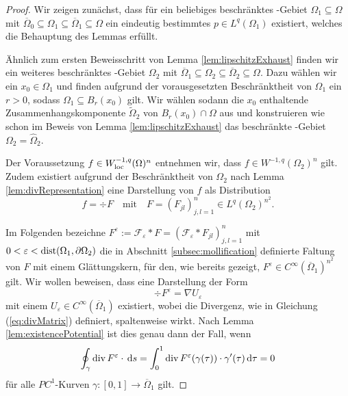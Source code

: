 \begin{proof}
  Wir zeigen zunächst, dass für ein beliebiges beschränktes \lipschitz\hyp{}Gebiet $\Omega_1 \subseteq \Omega$ mit $\overline\Omega_0 \subseteq \Omega_1 \subseteq \overline\Omega_1 \subseteq \Omega$ ein eindeutig bestimmtes $p \in L^q(\Omega_1)$ existiert, welches die Behauptung des Lemmas erfüllt.

  Ähnlich zum ersten Beweisschritt von Lemma \ref{lem:lipschitzExhaust} finden wir ein weiteres beschränktes \lipschitz\hyp{}Gebiet $\Omega_2$ mit $\overline\Omega_1 \subseteq \Omega_2 \subseteq \overline\Omega_2 \subseteq \Omega$.
  Dazu wählen wir ein $x_0 \in \Omega_1$ und finden aufgrund der vorausgesetzten Beschränktheit von $\Omega_1$ ein $r > 0$, sodass $\Omega_1 \subseteq B_r(x_0)$ gilt.
  Wir wählen sodann die $x_0$ enthaltende Zusammenhangskomponente $\widetilde\Omega_2$ von $B_r(x_0) \cap \Omega$ aus und konstruieren wie schon im Beweis von Lemma \ref{lem:lipschitzExhaust} das beschränkte \lipschitz\hyp{}Gebiet $\Omega_2 = \widehat\Omega_2$.

  Der Voraussetzung $f \in W_{\operatorname{loc}}^{-1,q}(\Omega)^n$ entnehmen wir, dass $f \in W^{-1,q}(\Omega_2)^n$ gilt. Zudem existiert aufgrund der Beschränktheit von $\Omega_2$ nach Lemma \ref{lem:divRepresentation} eine Darstellung von $f$ als Distribution
  $$
  f = \div F \quad\text{mit}\quad F = (F_{jl})_{j,l=1}^n \in L^q(\Omega_2)^{n^2}.
  $$

  Im Folgenden bezeichne $F^\varepsilon := \mathcal{F}_\varepsilon \ast F = (\mathcal{F}_\varepsilon \ast F_{jl})_{j,l=1}^n$ mit $0 < \varepsilon < \operatorname{dist}(\Omega_1, \partial\Omega_2)$ die in Abschnitt \ref{subsec:mollification} definierte Faltung von $F$ mit einem Glättungskern, für den, wie bereits gezeigt, $F^\varepsilon \in C^\infty(\overline\Omega_1)^{n^2}$ gilt.
  Wir wollen beweisen, dass eine Darstellung der Form
  \begin{equation}
    \label{eq:divNabla}
    \div F^\varepsilon = \nabla U_\varepsilon
  \end{equation}
  mit einem $U_\varepsilon \in C^\infty(\overline\Omega_1)$ existiert, wobei die Divergenz, wie in Gleichung (\ref{eq:divMatrix}) definiert, spaltenweise wirkt.
  Nach Lemma \ref{lem:existencePotential} ist dies genau dann der Fall, wenn
  $$
  \oint_\gamma \mathrm{div\,} F^\varepsilon \cdot \, {\operatorname{d}\!{s}} = \int_0^1 \mathrm{div\,} F^\varepsilon(\gamma(\tau))\cdot \gamma'(\tau) \, {\operatorname{d}\!{\tau}} = 0
  $$
  für alle $PC^1$-Kurven $\gamma \colon [0,1] \to \overline\Omega_1$ gilt.


\end{proof}

